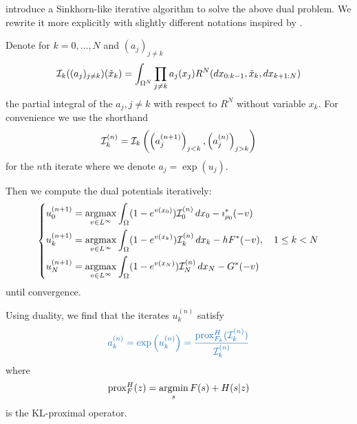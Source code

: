 \documentclass[../report.tex]{subfiles}
\begin{document}
\textcite{benamou2018entropy} introduce a Sinkhorn-like iterative algorithm to solve the above dual problem. We rewrite it more explicitly with slightly different notations inspired by \cite{chizat2016scaling}.

\begin{prop}\label{algo:Algo1}
	Denote for $k=0,\ldots,N$ and $(a_j)_{j\neq k}$
	\[
	\mathcal{I}_k((a_j)_{j\neq k})(\tilde{x}_k) = 
	\int_{\Omega^N}
	\prod_{j\neq k} a_j(x_j)
	R^N(dx_{0:k-1}, \tilde{x}_k, dx_{k+1:N})
	\]
	the partial integral of the $a_j,j\neq k$ with respect to $R^N$ without variable $x_k$.
	For convenience we use the shorthand
	\[
	\mathcal{I}_k^{(n)} = \mathcal{I}_k\left(\left(a^{(n+1)}_j\right)_{j<k},
	\left(a^{(n)}_j\right)_{j>k}\right)
	\]
	for the $n$th iterate where we denote $a_j = \exp(u_j)$.
	
	Then we compute the dual potentials iteratively:
	\begin{equation}
	\begin{dcases}
	u_0^{(n+1)} = \operatorname*{argmax}_{v \in L^\infty} \int_{\Omega} (1 - e^{v(x_0)}) \mathcal{I}_0^{(n)} \,dx_0 - \imath_{\rho_0}^*(-v) \\
	u_k^{(n+1)} = \operatorname*{argmax}_{v \in L^\infty} \int_{\Omega} (1- e^{v(x_k)}) \mathcal{I}_k^{(n)} \,dx_k - hF^*(-v) ,
	\quad 1\leq k < N  \\
	u_N^{(n+1)} = \operatorname*{argmax}_{v \in L^\infty} \int_{\Omega} (1 - e^{v(x_N)}) \mathcal{I}_N^{(n)} \,dx_N - G^*(-v)
	\end{dcases}
	\end{equation}
	until convergence.
	
	Using duality, we find that the iterates $u_k^{(n)}$ satisfy
	\begin{equation}
	{\bluefont
	a_k^{(n)} = \exp\left(u^{(n)}_k\right) =
	\frac{
		\prox_{F_k}^{H}(\calI_k^{(n)})
	}{\calI_k^{(n)}}}
	\end{equation}
	where
	\[
		\operatorname{prox}_F^{H}(z) = \operatorname*{argmin}_{s} F(s) + H(s|z)
	\]
	is the KL-proximal operator.
\end{prop}
\end{document}
